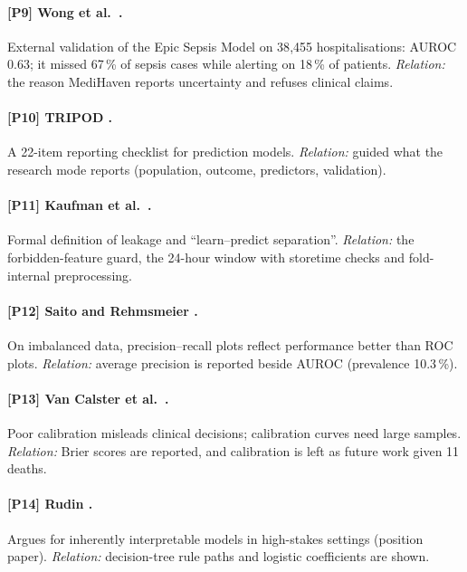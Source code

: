\paragraph{[P9] Wong et al.\ \cite{wong2021epicsepsis}.} External validation of the Epic Sepsis Model on
38{,}455 hospitalisations: AUROC 0.63; it missed 67\,\% of sepsis cases while alerting on 18\,\% of
patients. \emph{Relation:} the reason MediHaven reports uncertainty and refuses clinical claims.

\paragraph{[P10] TRIPOD \cite{collins2015tripod}.} A 22-item reporting checklist for prediction models.
\emph{Relation:} guided what the research mode reports (population, outcome, predictors, validation).

\paragraph{[P11] Kaufman et al.\ \cite{kaufman2012leakage}.} Formal definition of leakage and
``learn--predict separation''. \emph{Relation:} the forbidden-feature guard, the 24-hour window with
storetime checks and fold-internal preprocessing.

\paragraph{[P12] Saito and Rehmsmeier \cite{saito2015precision}.} On imbalanced data,
precision--recall plots reflect performance better than ROC plots. \emph{Relation:} average precision is
reported beside AUROC (prevalence 10.3\,\%).

\paragraph{[P13] Van Calster et al.\ \cite{vancalster2019calibration}.} Poor calibration misleads clinical
decisions; calibration curves need large samples. \emph{Relation:} Brier scores are reported, and
calibration is left as future work given 11 deaths.

\paragraph{[P14] Rudin \cite{rudin2019stop}.} Argues for inherently interpretable models in high-stakes
settings (position paper). \emph{Relation:} decision-tree rule paths and logistic coefficients are shown.

